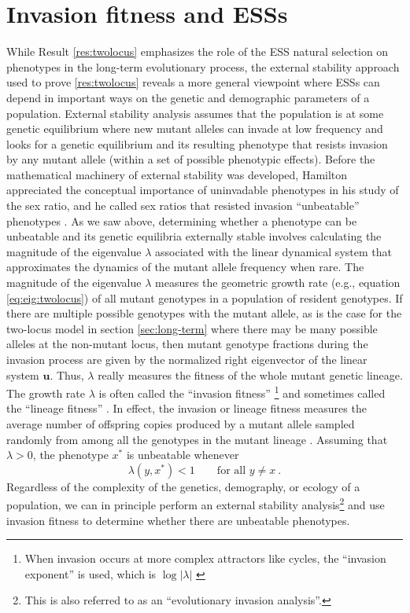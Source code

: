 \documentclass[11pt]{article}
\newcommand{\ess}[1]{#1^*}
\renewcommand{\vec}[1]{\symbf{#1}}
\newcommand{\eig}{\lambda}
\begin{document}
\section{Invasion fitness and ESSs}

While Result \ref{res:twolocus} emphasizes the role of the ESS natural selection on phenotypes in the long-term evolutionary process, the external stability approach used to prove \ref{res:twolocus} reveals a more general viewpoint where ESSs can depend in important ways on the genetic and demographic parameters of a population. External stability analysis assumes that the population is at some genetic equilibrium where new mutant alleles can invade at low frequency and looks for a genetic equilibrium and its resulting phenotype that resists invasion by any mutant allele (within a set of possible phenotypic effects). Before the mathematical machinery of external stability was developed, Hamilton appreciated the conceptual importance of uninvadable phenotypes in his study of the sex ratio, and he called sex ratios that resisted invasion ``unbeatable'' phenotypes \cite{Hamilton:1967}. As we saw above, determining whether a phenotype can be unbeatable and its genetic equilibria externally stable involves calculating the magnitude of the eigenvalue $\eig$ associated with the linear dynamical system that approximates the dynamics of the mutant allele frequency when rare. The magnitude of the eigenvalue $\eig$ measures the geometric growth rate (e.g., equation \eqref{eq:eig:twolocus}) of all mutant genotypes in a population of resident genotypes. If there are multiple possible genotypes with the mutant allele, as is the case for the two-locus model in section \ref{sec:long-term} where there may be many possible alleles at the non-mutant locus, then mutant genotype fractions during the invasion process are given by the normalized right eigenvector of the linear system $\vec{u}$. Thus, $\eig$ really measures the fitness of the whole mutant genetic lineage. The growth rate $\eig$ is often called the ``invasion fitness'' \cite{Metz:Nisbet:1992,Heino:Metz:1998}\footnote{When invasion occurs at more complex attractors like cycles, the ``invasion exponent'' is used, which is $\log |\eig|$ \cite{Rand:Wilson:1994}} and sometimes called the ``lineage fitness'' \cite{Lehmann:Alger:2015,Akcay:VanCleve:2016,Lehmann:Mullon:2016,Lehmann:Rousset:2020}. In effect, the invasion or lineage fitness measures the average number of offspring copies produced by a mutant allele sampled randomly from among all the genotypes in the mutant lineage \cite{Lehmann:Mullon:2016}. Assuming that $\eig >0$, the phenotype $\ess{x}$ is unbeatable whenever
\begin{equation}
  \label{eq:unbeatable}
  \eig(y, \ess{x}) < 1 \qquad \text{for all } y \ne x \: .
\end{equation}
Regardless of the complexity of the genetics, demography, or ecology of a population, we can in principle perform an external stability analysis\footnote{This is also referred to as an ``evolutionary invasion analysis''.} and use invasion fitness to determine whether there are unbeatable phenotypes.
\end{document}
